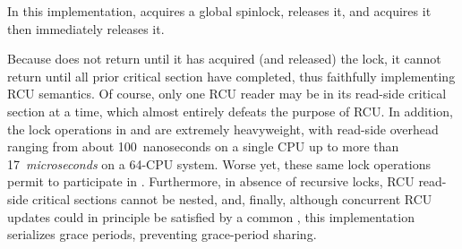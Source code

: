 In this implementation,  acquires a global
spinlock,  releases it, and
 acquires it then immediately releases it.

Because  does not return until it has acquired
(and released) the lock, it cannot return until all prior 
{critical section} have completed, thus faithfully implementing
RCU semantics.
Of course, only one RCU reader may be in its read-side critical section
at a time, which almost entirely defeats the purpose of RCU\@.
In addition, the lock operations in  and
 are extremely heavyweight,
with read-side overhead ranging from about 100~nanoseconds on a single 
CPU up to more than 17~\emph{microseconds} on a 64-CPU system.
Worse yet,
these same lock operations permit 
to participate in .
Furthermore, in absence of recursive locks,
RCU read-side critical sections cannot be nested, and, finally,
although concurrent RCU updates could in principle be satisfied by
a common , this implementation serializes grace periods,
preventing grace-period sharing.

